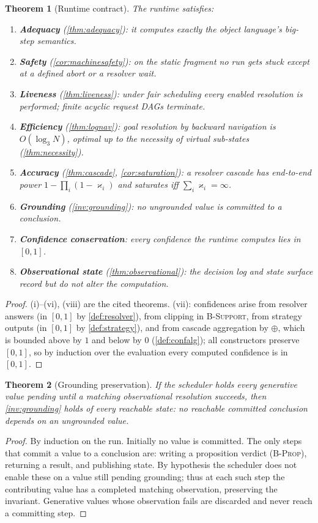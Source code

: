 \documentclass[11pt,a4paper]{article}
\theoremstyle{plain}
\newtheorem{theorem}{Theorem}[section]
\theoremstyle{definition}
\theoremstyle{remark}
\newcommand{\Unit}{[0,1]}
\newcommand{\nor}{\oplus}
\newcommand{\catp}{\varkappa}              %
\newcommand{\rn}[1]{\textsc{#1}}
\begin{document}
\begin{theorem}[Runtime contract]
\label{thm:contract}
The runtime satisfies:
\begin{enumerate}[label=(\roman*),leftmargin=1.9em,nosep]
\item \textbf{Adequacy} (\cref{thm:adequacy}): it computes exactly the object
language's big-step semantics.
\item \textbf{Safety} (\cref{cor:machinesafety}): on the static fragment no run
gets stuck except at a defined abort or a resolver wait.
\item \textbf{Liveness} (\cref{thm:liveness}): under fair scheduling every
enabled resolution is performed; finite acyclic request DAGs terminate.
\item \textbf{Efficiency} (\cref{thm:lognav}): goal resolution by backward
navigation is $O(\log_3 N)$, optimal up to the necessity of virtual sub-states
(\cref{thm:necessity}).
\item \textbf{Accuracy} (\cref{thm:cascade}, \cref{cor:saturation}): a resolver
cascade has end-to-end power $1-\prod_i(1-\catp_i)$ and saturates iff
$\sum_i\catp_i=\infty$.
\item \textbf{Grounding} (\cref{inv:grounding}): no ungrounded value is
committed to a conclusion.
\item \textbf{Confidence conservation}: every confidence the runtime computes
lies in $\Unit$.
\item \textbf{Observational state} (\cref{thm:observational}): the decision log
and state surface record but do not alter the computation.
\end{enumerate}
\end{theorem}
\begin{proof}
(i)--(vi), (viii) are the cited theorems. (vii): confidences arise from resolver
answers (in $\Unit$ by \cref{def:resolver}), from clipping in \rn{B-Support},
from strategy outputs (in $\Unit$ by \cref{def:strategy}), and from cascade
aggregation by $\nor$, which is bounded above by $1$ and below by $0$
(\cref{def:confalg}); all constructors preserve $\Unit$, so by induction over
the evaluation every computed confidence is in $\Unit$.
\end{proof}

\begin{theorem}[Grounding preservation]
\label{thm:groundpres}
If the scheduler holds every generative value pending until a matching
observational resolution succeeds, then \cref{inv:grounding} holds of every
reachable state: no reachable committed conclusion depends on an ungrounded
value.
\end{theorem}
\begin{proof}
By induction on the run. Initially no value is committed. The only steps that
commit a value to a conclusion are: writing a proposition verdict (\rn{B-Prop}),
returning a result, and publishing state. By hypothesis the scheduler does not
enable these on a value still pending grounding; thus at each such step the
contributing value has a completed matching observation, preserving the
invariant. Generative values whose observation fails are discarded and never
reach a committing step.
\end{proof}
\end{document}
